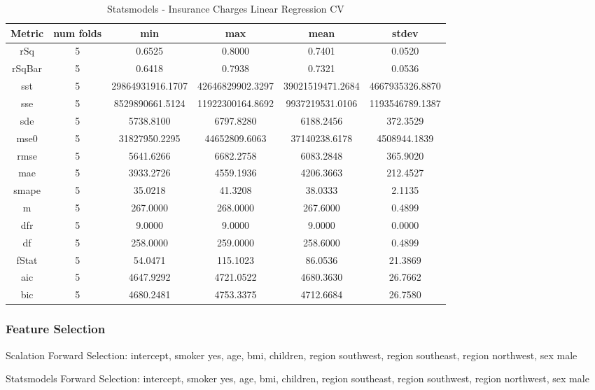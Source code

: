 \documentclass{article}
\begin{document}
\begin{table}[H]
\centering
\caption{Statsmodels - Insurance Charges Linear Regression CV}
\label{tab:Statsmodels - Insurance Charges Linear Regression CV}
\begin{tabular}{|c|c|c|c|c|c|}\hline
Metric & num folds & min & max & mean & stdev \\ \hline \hline
rSq & 5 & 0.6525 & 0.8000 & 0.7401 & 0.0520 \\ \hline
rSqBar & 5 & 0.6418 & 0.7938 & 0.7321 & 0.0536 \\ \hline
sst & 5 & 29864931916.1707 & 42646829902.3297 & 39021519471.2684 & 4667935326.8870 \\ \hline
sse & 5 & 8529890661.5124 & 11922300164.8692 & 9937219531.0106 & 1193546789.1387 \\ \hline
sde & 5 & 5738.8100 & 6797.8280 & 6188.2456 & 372.3529 \\ \hline
mse0 & 5 & 31827950.2295 & 44652809.6063 & 37140238.6178 & 4508944.1839 \\ \hline
rmse & 5 & 5641.6266 & 6682.2758 & 6083.2848 & 365.9020 \\ \hline
mae & 5 & 3933.2726 & 4559.1936 & 4206.3663 & 212.4527 \\ \hline
smape & 5 & 35.0218 & 41.3208 & 38.0333 & 2.1135 \\ \hline
m & 5 & 267.0000 & 268.0000 & 267.6000 & 0.4899 \\ \hline
dfr & 5 & 9.0000 & 9.0000 & 9.0000 & 0.0000 \\ \hline
df & 5 & 258.0000 & 259.0000 & 258.6000 & 0.4899 \\ \hline
fStat & 5 & 54.0471 & 115.1023 & 86.0536 & 21.3869 \\ \hline
aic & 5 & 4647.9292 & 4721.0522 & 4680.3630 & 26.7662 \\ \hline
bic & 5 & 4680.2481 & 4753.3375 & 4712.6684 & 26.7580 \\ \hline
\end{tabular}
\end{table}

\subsubsection{Feature Selection}

Scalation Forward Selection: intercept, smoker yes, age, bmi, children, region southwest, region southeast, region northwest, sex male

Statsmodels Forward Selection: intercept, smoker yes, age, bmi, children, region southeast, region southwest, region northwest, sex male
\end{document}
